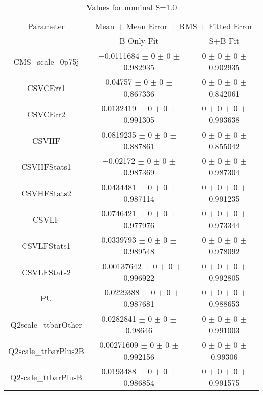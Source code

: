 \begin{table}
\centering
\caption{Values for nominal S=1.0}
\begin{tabular}{ccc}
\toprule
Parameter & \multicolumn{2}{c}{Mean $\pm$ Mean Error $\pm$ RMS $\pm$ Fitted Error}\\
 & B-Only Fit & S+B Fit\\
\midrule
CMS\_scale\_0p75j & \num{-0.0111684} $\pm$ \num{0} $\pm$ \num{0} $\pm$ \num{0.982935} & \num{0} $\pm$ \num{0} $\pm$ \num{0} $\pm$ \num{0.902935}\\
CSVCErr1 & \num{0.04757} $\pm$ \num{0} $\pm$ \num{0} $\pm$ \num{0.867336} & \num{0} $\pm$ \num{0} $\pm$ \num{0} $\pm$ \num{0.842061}\\
CSVCErr2 & \num{0.0132419} $\pm$ \num{0} $\pm$ \num{0} $\pm$ \num{0.991305} & \num{0} $\pm$ \num{0} $\pm$ \num{0} $\pm$ \num{0.993638}\\
CSVHF & \num{0.0819235} $\pm$ \num{0} $\pm$ \num{0} $\pm$ \num{0.887861} & \num{0} $\pm$ \num{0} $\pm$ \num{0} $\pm$ \num{0.855042}\\
CSVHFStats1 & \num{-0.02172} $\pm$ \num{0} $\pm$ \num{0} $\pm$ \num{0.987369} & \num{0} $\pm$ \num{0} $\pm$ \num{0} $\pm$ \num{0.987304}\\
CSVHFStats2 & \num{0.0434481} $\pm$ \num{0} $\pm$ \num{0} $\pm$ \num{0.987114} & \num{0} $\pm$ \num{0} $\pm$ \num{0} $\pm$ \num{0.991235}\\
CSVLF & \num{0.0746421} $\pm$ \num{0} $\pm$ \num{0} $\pm$ \num{0.977976} & \num{0} $\pm$ \num{0} $\pm$ \num{0} $\pm$ \num{0.973344}\\
CSVLFStats1 & \num{0.0339793} $\pm$ \num{0} $\pm$ \num{0} $\pm$ \num{0.989548} & \num{0} $\pm$ \num{0} $\pm$ \num{0} $\pm$ \num{0.978092}\\
CSVLFStats2 & \num{-0.00137642} $\pm$ \num{0} $\pm$ \num{0} $\pm$ \num{0.996922} & \num{0} $\pm$ \num{0} $\pm$ \num{0} $\pm$ \num{0.992805}\\
PU & \num{-0.0229388} $\pm$ \num{0} $\pm$ \num{0} $\pm$ \num{0.987681} & \num{0} $\pm$ \num{0} $\pm$ \num{0} $\pm$ \num{0.988653}\\
Q2scale\_ttbarOther & \num{0.0282841} $\pm$ \num{0} $\pm$ \num{0} $\pm$ \num{0.98646} & \num{0} $\pm$ \num{0} $\pm$ \num{0} $\pm$ \num{0.991003}\\
Q2scale\_ttbarPlus2B & \num{0.00271609} $\pm$ \num{0} $\pm$ \num{0} $\pm$ \num{0.992156} & \num{0} $\pm$ \num{0} $\pm$ \num{0} $\pm$ \num{0.99306}\\
Q2scale\_ttbarPlusB & \num{0.0193488} $\pm$ \num{0} $\pm$ \num{0} $\pm$ \num{0.986854} & \num{0} $\pm$ \num{0} $\pm$ \num{0} $\pm$ \num{0.991575}\\

\end{tabular}
\end{table}
